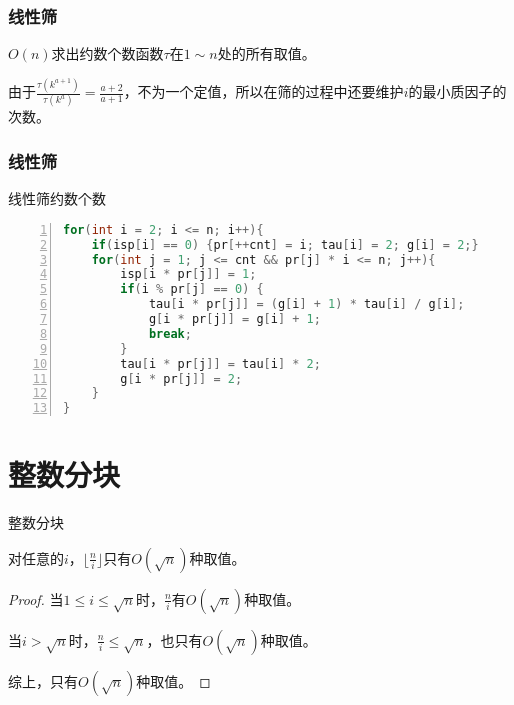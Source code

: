 \documentclass{ctexbeamer}        %
\begin{document}
\begin{frame}[fragile]
\frametitle{线性筛}
\begin{example}[线性筛约数个数]
    $O(n)$求出约数个数函数$\tau$在$1 \sim n$处的所有取值。
\end{example}
由于$\frac{\tau(k^{a+1})}{\tau(k^a)}=\frac{a+2}{a+1}$，不为一个定值，所以在筛的过程中还要维护$i$的最小质因子的次数。
\end{frame}

\begin{frame}[fragile]
\frametitle{线性筛}
\begin{block}{线性筛约数个数}
\begin{lstlisting}[language={c++},
                   numbers=left]
for(int i = 2; i <= n; i++){
    if(isp[i] == 0) {pr[++cnt] = i; tau[i] = 2; g[i] = 2;}
    for(int j = 1; j <= cnt && pr[j] * i <= n; j++){  
        isp[i * pr[j]] = 1;  
        if(i % pr[j] == 0) {
            tau[i * pr[j]] = (g[i] + 1) * tau[i] / g[i];
            g[i * pr[j]] = g[i] + 1;
            break;
        }
        tau[i * pr[j]] = tau[i] * 2;
        g[i * pr[j]] = 2;
    }
}
\end{lstlisting}
\end{block}
\end{frame}

\section{整数分块}

\begin{frame}{整数分块}

\begin{theorem}[整数分块]
    对任意的$i$，$\lfloor \frac{n}{i} \rfloor$只有$O(\sqrt{n})$种取值。
\end{theorem}

\begin{proof}
    当$1\le i \le \sqrt{n}$时，$\frac{n}{i}$有$O(\sqrt{n})$种取值。

    当$i > \sqrt{n}$时，$\frac{n}{i} \le \sqrt{n}$，也只有$O(\sqrt{n})$种取值。

    综上，只有$O(\sqrt{n})$种取值。
\end{proof}

\end{frame}
\end{document}
